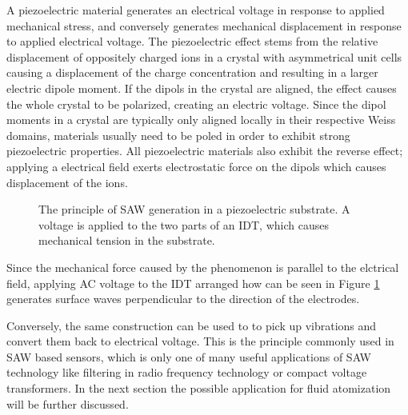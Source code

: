 A piezoelectric material generates an electrical voltage in response to applied mechanical stress, and conversely generates mechanical displacement in response to applied electrical voltage. 
The piezoelectric effect stems from the relative displacement of oppositely charged ions in a crystal with asymmetrical unit cells causing a displacement of the charge concentration and resulting in a larger electric dipole moment. 
If the dipols in the crystal are aligned, the effect causes the whole crystal to be polarized, creating an electric voltage. 
Since the dipol moments in a crystal are typically only aligned locally in their respective Weiss domains, materials usually need to be poled in order to exhibit strong piezoelectric properties. \cite{liLeadfreePiezoelectricMaterials2021}
All piezoelectric materials also exhibit the reverse effect; applying a electrical field exerts electrostatic force on the dipols which causes displacement of the ions.

\begin{figure}[htbp]
    \centering
    \caption{The principle of SAW generation in a piezoelectric substrate. A voltage is applied to the two parts of an IDT, which causes mechanical tension in the substrate.}
    \label{fig:idt}
\end{figure}

Since the mechanical force caused by the phenomenon is parallel to the elctrical field, applying AC voltage to the IDT arranged how can be seen in Figure \ref{fig:idt} generates surface waves perpendicular to the direction of the electrodes.

Conversely, the same construction can be used to to pick up vibrations and convert them back to electrical voltage. 
This is the principle commonly used in SAW based sensors, which is only one of many useful applications of SAW technology like filtering in radio frequency technology or compact voltage transformers. 
In the next section the possible application for fluid atomization will be further discussed.